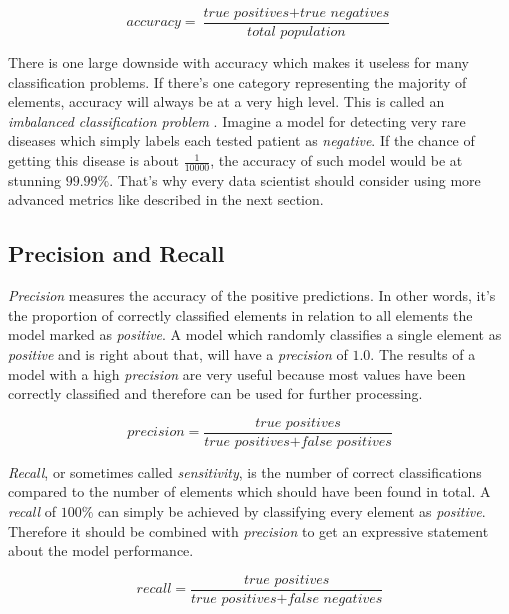 \begin{equation}
    \label{math:accuracy}
    accuracy = \frac{\textit{true positives} + \textit{true negatives}}{\textit{total population}}
\end{equation}

There is one large downside with accuracy which makes it useless for many classification problems. If there's one category
representing the majority of elements, accuracy will always be at a very high level. This is called an \emph{imbalanced
classification problem} \cite{koehrsen}. Imagine a model for detecting very rare diseases which simply labels each tested patient
as \emph{negative}. If the chance of getting this disease is about \(\frac{1}{10000}\), the accuracy of such model would be at
stunning $99.99\%$. That's why every data scientist should consider using more advanced metrics like described in the next section.

\subsection{Precision and Recall}

\emph{Precision} measures the accuracy of the positive predictions. In other words, it's the proportion of correctly classified
elements in relation to all elements the model marked as \emph{positive}. A model which randomly classifies a single element as
\emph{positive} and is right about that, will have a \emph{precision} of $1.0$. The results of a model with a high \emph{precision}
are very useful because most values have been correctly classified and therefore can be used for further processing.

\begin{equation}
    \label{math:precision}
    precision = \frac{\textit{true positives}}{\textit{true positives} + \textit{false positives}}
\end{equation}

\emph{Recall}, or sometimes called \emph{sensitivity}, is the number of correct classifications compared to the number of elements
which should have been found in total. A \emph{recall} of $100\%$ can simply be achieved by classifying every element as \emph{positive}.
Therefore it should be combined with \emph{precision} to get an expressive statement about the model performance.

\begin{equation}
    \label{math:recall}
    recall = \frac{\textit{true positives}}{\textit{true positives} + \textit{false negatives}}
\end{equation}

